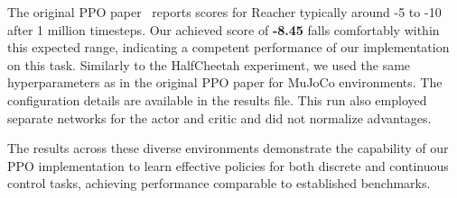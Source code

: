 The original PPO paper~\cite{schulman2017proximal} reports scores for Reacher typically around -5 to -10 after 1 million timesteps. Our achieved score of \textbf{-8.45} falls comfortably within this expected range, indicating a competent performance of our implementation on this task. Similarly to the HalfCheetah experiment, we used the same hyperparameters as in the original PPO paper for MuJoCo environments. The configuration details are available in the results file. This run also employed separate networks for the actor and critic and did not normalize advantages.

The results across these diverse environments demonstrate the capability of our PPO implementation to learn effective policies for both discrete and continuous control tasks, achieving performance comparable to established benchmarks.